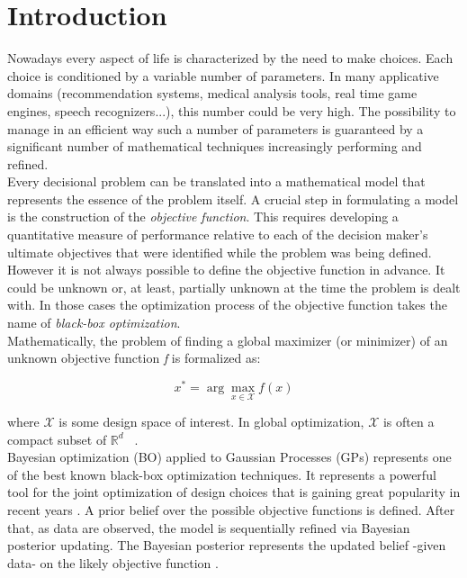 \chapter{Introduction}

Nowadays every aspect of life is characterized by the need to make choices. Each choice is conditioned by a variable number of parameters. In many applicative domains (recommendation systems, medical analysis tools, real time game engines, speech recognizers...), this number could be very high.  The possibility to manage in an efficient way such a number of parameters is guaranteed by a significant number of mathematical techniques increasingly performing and refined.  \\

Every decisional problem can be translated into a mathematical model that represents the essence of the problem itself. A crucial step in formulating a model is the construction of the \textit{objective function}. This requires developing a quantitative measure of performance relative to each of the decision maker’s ultimate objectives that were identified while the problem was being defined.~\cite{HillLieb01} \\

However it is not always possible to define the objective function in advance. It could be unknown or, at least, partially unknown at the time the problem is dealt with. In those cases the optimization process of the objective function takes the name of \textit{black-box optimization}. \\

Mathematically, the problem of finding a global maximizer (or minimizer) of an unknown objective function \textit{f} is formalized as:

\begin{equation}
x^* = \arg \max_{x \in \mathcal{X}} f(x)
\end{equation}

where $\mathcal{X}$ is some design space of interest. In global optimization, $\mathcal{X}$ is often a compact subset of $\mathbb{R}^d$ ~\cite{DBLP:journals/pieee/ShahriariSWAF16}. \\

Bayesian optimization (BO) applied to Gaussian Processes (GPs) represents one of the best known black-box optimization techniques. It represents a powerful tool for the joint optimization of design choices that is gaining great popularity in recent years \cite{Adams2008GaussianPP}. A prior belief over the possible objective functions is defined. After that, as data are observed, the model is sequentially refined via Bayesian posterior updating. The Bayesian posterior represents the updated belief -given data- on the likely objective function \cite{DBLP:journals/pieee/ShahriariSWAF16}. \\

